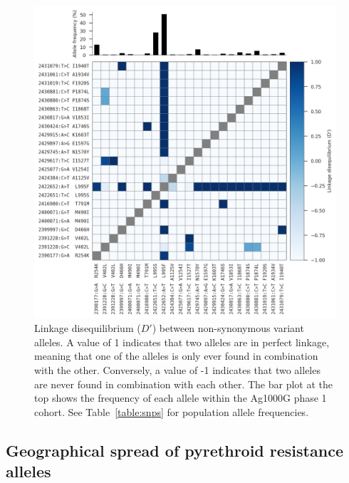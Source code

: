 \begin{refsection}
\begin{figure}[t!]
\centering
\includegraphics[width=0.9\linewidth,center]{artwork/chapter6/ld.png}
\caption{Linkage disequilibrium ($D'$) between non-synonymous variant alleles.
%
A value of 1 indicates that two alleles are in perfect linkage, meaning that one of the alleles is only ever found in combination with the other.
%
Conversely, a value of -1 indicates that two alleles are never found in combination with each other.
%
The bar plot at the top shows the frequency of each allele within the Ag1000G phase 1 cohort.
%
See Table~\ref{table:snps} for population allele frequencies.
}
\label{fig:ch6-ld}
\end{figure}


\subsection{Geographical spread of pyrethroid resistance alleles}\label{subsec:results-spread}



\end{refsection}
